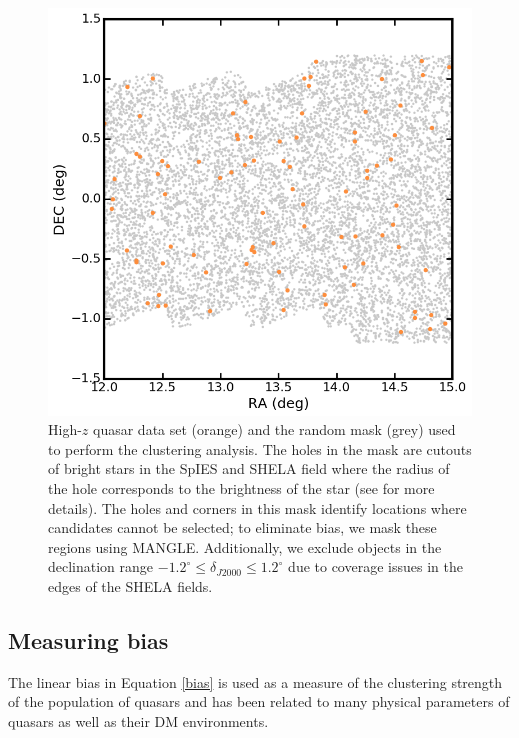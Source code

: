 \documentclass[apj, numberedappendix]{emulateapj}
\begin{document}
\begin{figure}[h!]
\centering
\includegraphics[scale = 0.45]{./New_Plots/spies_zoom.png}
\caption{\footnotesize{High-$z$ quasar data set (orange) and the random mask (grey) used to perform the clustering analysis. The holes in the mask are cutouts of bright stars in the SpIES and SHELA field where the radius of the hole corresponds to the brightness of the star (see \citealt{Timlin2016} for more details). The holes and corners in this mask identify locations where candidates cannot be selected; to eliminate bias, we mask these regions using MANGLE. Additionally, we exclude objects in the declination range $-1.2^{\circ} \leq \delta_{J2000} \leq 1.2^{\circ}$ due to coverage issues in the edges of the SHELA fields.}}
\label{fig:rndmsk}
\end{figure}

 
 \subsection{Measuring bias}
The linear bias in Equation \ref{bias} is used as a measure of the clustering strength of the population of quasars and has been related to many physical parameters of quasars as well as their DM environments.
\end{document}
